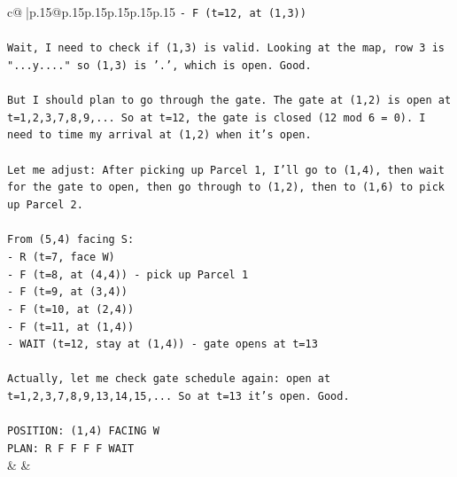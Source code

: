 \documentclass{article}
\begin{document}
{\begin{supertabular}{c@{$\;$}|p{.15\linewidth}@{}p{.15\linewidth}p{.15\linewidth}p{.15\linewidth}p{.15\linewidth}p{.15\linewidth}}
{{{\texttt{{-} F (t=12, at (1,3))} \\
\\ 
\texttt{Wait, I need to check if (1,3) is valid. Looking at the map, row 3 is "...y...." so (1,3) is '.', which is open. Good.} \\
\\ 
\texttt{But I should plan to go through the gate. The gate at (1,2) is open at t=1,2,3,7,8,9,... So at t=12, the gate is closed (12 mod 6 = 0). I need to time my arrival at (1,2) when it's open.} \\
\\ 
\texttt{Let me adjust: After picking up Parcel 1, I'll go to (1,4), then wait for the gate to open, then go through to (1,2), then to (1,6) to pick up Parcel 2.} \\
\\ 
\texttt{From (5,4) facing S:} \\
\texttt{{-} R (t=7, face W)} \\
\texttt{{-} F (t=8, at (4,4)) {-} pick up Parcel 1} \\
\texttt{{-} F (t=9, at (3,4))} \\
\texttt{{-} F (t=10, at (2,4))} \\
\texttt{{-} F (t=11, at (1,4))} \\
\texttt{{-} WAIT (t=12, stay at (1,4)) {-} gate opens at t=13} \\
\\ 
\texttt{Actually, let me check gate schedule again: open at t=1,2,3,7,8,9,13,14,15,... So at t=13 it's open. Good.} \\
\\ 
\texttt{POSITION: (1,4) FACING W} \\
\texttt{PLAN: R F F F F WAIT} \\
            }
        }
    }
    & & \\ \\


\end{supertabular}}
\end{document}
